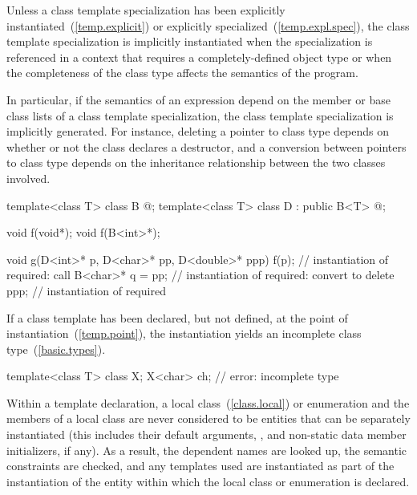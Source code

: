 \pnum
{}%
Unless a class template specialization has been explicitly
instantiated~(\ref{temp.explicit}) or explicitly
specialized~(\ref{temp.expl.spec}),
the class template specialization is implicitly instantiated when the
specialization is referenced in a context that requires a completely-defined
object type or when the completeness of the class type affects the semantics
of the program.
\begin{note}
In particular, if the semantics of an expression depend on the member or
base class lists of a class template specialization, the class template
specialization is implicitly generated. For instance, deleting a pointer
to class type depends on whether or not the class declares a destructor,
and a conversion between pointers to class type depends on the
inheritance relationship between the two classes involved.
\end{note}
\begin{example}
\begin{codeblock}
template<class T> class B { @\commentellip@ };
template<class T> class D : public B<T> { @\commentellip@ };

void f(void*);
void f(B<int>*);

void g(D<int>* p, D<char>* pp, D<double>* ppp) {
  f(p);             // instantiation of  required: call 
  B<char>* q = pp;  // instantiation of  required: convert  to 
  delete ppp;       // instantiation of  required
}
\end{codeblock}
\end{example}
If a class template has been declared, but not defined,
at the point of instantiation~(\ref{temp.point}),
the instantiation yields an incomplete class type~(\ref{basic.types}).
\begin{example}
\begin{codeblock}
template<class T> class X;
X<char> ch;         // error: incomplete type 
\end{codeblock}
\end{example}
\begin{note}
Within a template declaration,
a local class~(\ref{class.local}) or enumeration and the members of
a local class are never considered to be entities that can be separately
instantiated (this includes their default arguments,
, and non-static data member
initializers, if any). As a result, the dependent names are looked up, the
semantic constraints are checked, and any templates used are instantiated as
part of the instantiation of the entity within which the local class or
enumeration is declared.
\end{note}
